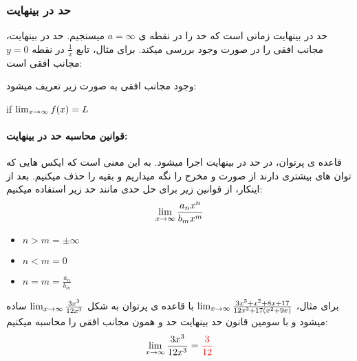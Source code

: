 \documentclass[12pt, a4paper, oneside]{article}
\begin{document}
\subsubsection{حد در بینهایت}
حد در بینهایت زمانی است که حد را در نقطه ی $a=\infty$ میسنجیم. حد در بینهایت، مجانب افقی را در صورت وجود بررسی میکند.
برای مثال، تابع $\frac{1}{x}$ در نقطه $y=0$ مجانب افقی است:


\noindent
وجود مجانب افقی به صورت زیر تعریف میشود:

\begin{latin}
\begin{center}
    if $\lim_{x \to \infty} f(x) = L$
\end{center}
\end{latin}
\paragraph{
قوانین محاسبه حد در بینهایت:
\\}
قاعده ی پرتوان، در حد در بینهایت اجرا میشود. به این معنی است که ایکس هایی که توان های بیشتری دارند از صورت و مخرج را نگه میداریم و بقیه را حذف میکنیم.
بعد از اینکار، از قوانین زیر برای حل حدی مانند حد زیر استفاده میکنیم: 
\[\lim_{x \to \infty} \frac{a_nx^n}{b_mx^m}\]

\begin{latin}
\begin{itemize}
    \item $n > m = \pm \infty$
    \item $n < m = 0$
    \item $n = m = \frac{ a_n }{ b_m }$
\end{itemize}
\end{latin}

برای مثال، $\lim_{x \to \infty} \frac{3x^3+x^2+8x+17}{12x^3+17(x^2+9x)}$ با قاعده ی پرتوان به شکل $\lim_{x \to \infty} \frac{3x^3}{12x^3}$ ساده میشود و با سومین قانون حد بینهایت حد و همون مجانب افقی را محاسبه میکنیم:
\[\lim_{x \to \infty} \frac{3x^3}{12x^3} = \textcolor{red}{ \frac{3}{12} }\]

\end{document}
